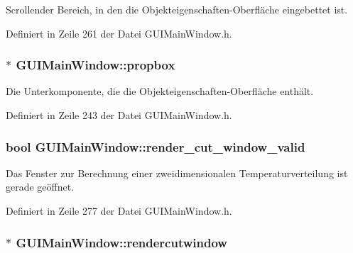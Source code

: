 Scrollender Bereich, in den die Objekteigenschaften-\/\-Oberfläche eingebettet ist. 



Definiert in Zeile 261 der Datei G\-U\-I\-Main\-Window.\-h.

\hypertarget{classGUIMainWindow_a4959774563543927a492bf06e441920e}{
\subsubsection[{propbox}]{$\ast$ G\-U\-I\-Main\-Window\-::propbox\hspace{0.3cm}{\ttfamily [private]}}}\label{classGUIMainWindow_a4959774563543927a492bf06e441920e}


Die Unterkomponente, die die Objekteigenschaften-\/\-Oberfläche enthält. 



Definiert in Zeile 243 der Datei G\-U\-I\-Main\-Window.\-h.

\hypertarget{classGUIMainWindow_a4f08d8e4294955a3cc0b071dd3cad0d2}{
\subsubsection[{render\-\_\-cut\-\_\-window\-\_\-valid}]{\setlength{\rightskip}{0pt plus 5cm}bool G\-U\-I\-Main\-Window\-::render\-\_\-cut\-\_\-window\-\_\-valid\hspace{0.3cm}{\ttfamily [private]}}}\label{classGUIMainWindow_a4f08d8e4294955a3cc0b071dd3cad0d2}


Das Fenster zur Berechnung einer zweidimensionalen Temperaturverteilung ist gerade geöffnet. 



Definiert in Zeile 277 der Datei G\-U\-I\-Main\-Window.\-h.

\hypertarget{classGUIMainWindow_a649cb92f27688772174659601188ac2d}{
\subsubsection[{rendercutwindow}]{$\ast$ G\-U\-I\-Main\-Window\-::rendercutwindow\hspace{0.3cm}{\ttfamily [private]}}}\label{classGUIMainWindow_a649cb92f27688772174659601188ac2d}


